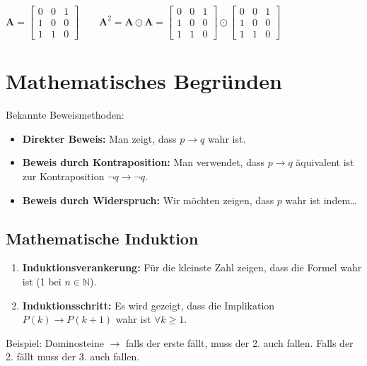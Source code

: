 \documentclass[12pt]{scrartcl}
\begin{document}
\renewcommand{\arraystretch}{1}
$\mathbf{A} = 
\begin{bmatrix}
    0 & 0 & 1\\
    1 & 0 & 0\\
    1 & 1 & 0
\end{bmatrix}\quad\quad \mathbf{A}^2 = \mathbf{A} \odot \mathbf{A} = 
\begin{bmatrix}
    0 & 0 & 1\\
    1 & 0 & 0\\
    1 & 1 & 0
\end{bmatrix} 
\odot
\begin{bmatrix}
    0 & 0 & 1\\
    1 & 0 & 0\\
    1 & 1 & 0
\end{bmatrix}$

\newpage
\section{Mathematisches Begründen}
Bekannte Beweismethoden:
\begin{itemize}
    \item \textbf{Direkter Beweis:} Man zeigt, dass $p \rightarrow q$ wahr ist.
    \item \textbf{Beweis durch Kontraposition:} Man verwendet, dass $p \rightarrow q$ äquivalent ist zur Kontraposition
            $\lnot q \rightarrow \lnot q$.
    \item \textbf{Beweis durch Widerspruch:} Wir möchten zeigen, dass $p$ wahr ist indem\dots
\end{itemize}


\subsection{Mathematische Induktion}

\begin{enumerate}
    \item \textbf{Induktionsverankerung:} Für die kleinste Zahl zeigen, dass die Formel wahr ist (1 bei $n \in \mathbb{N}$).
    \item \textbf{Induktionsschritt:} Es wird gezeigt, dass die Implikation $P(k) \rightarrow P(k+1)$ wahr ist $\forall k \geq 1$.
\end{enumerate}

Beispiel: Dominosteine $\rightarrow$ falls der erste fällt, muss der 2. auch fallen. Falls der 2.
fällt muss der 3. auch fallen.\\
\end{document}
